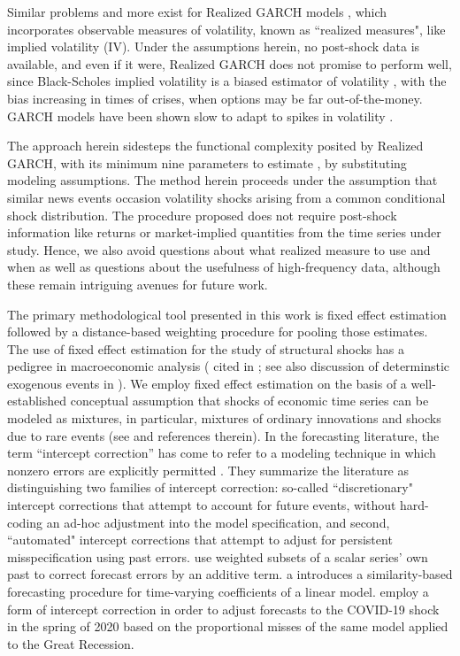 \documentclass[11pt,3p,review,authoryear]{elsarticle}
\theoremstyle{definition}
\begin{document}
Similar problems and more exist for Realized GARCH models \citep{hansen2012realized}, which incorporates observable measures of volatility, known as  ``realized measures", like implied volatility (IV).  Under the assumptions herein, no post-shock data is available, and even if it were, Realized GARCH does not promise to perform well, since Black-Scholes implied volatility is a biased estimator of volatility \citep{mayhew1995implied, christensen1998relation}, with the bias increasing in times of crises, when options may be far out-of-the-money.  GARCH models have been shown slow to adapt to spikes in volatility \citep{andersen2003modeling}.

The approach herein sidesteps the functional complexity posited by Realized GARCH, with its minimum nine parameters to estimate \citep{sharma2016forecasting}, by substituting modeling assumptions.  The method herein proceeds under the assumption that similar news events occasion volatility shocks arising from a common conditional shock distribution.  The procedure proposed does not require post-shock information like returns or market-implied quantities from the time series under study.  Hence, we also avoid questions about what realized measure to use and when as well as questions about the usefulness of high-frequency data, although these remain intriguing avenues for future work.

The primary methodological tool presented in this work is fixed effect estimation followed by a distance-based weighting procedure for pooling those estimates.  The use of fixed effect estimation for the study of structural shocks has a pedigree in macroeconomic analysis (\citet{romer1989does} cited in \citet{kilian2017structural}; see also discussion of determinstic exogenous events in \citet{engle2001good}).  We employ fixed effect estimation on the basis of a well-established conceptual assumption that shocks of economic time series can be modeled as mixtures, in particular, mixtures of ordinary innovations and shocks due to rare events (see \cite{phillips1996forecasting} and references therein).  In the forecasting literature, the term ``intercept correction'' has come to refer to a modeling technique in which nonzero errors are explicitly permitted \citep{hendry1994theory, clements1998forecasting}.  They summarize the literature as distinguishing two families of intercept correction: so-called ``discretionary" intercept corrections that attempt to account for future events, without hard-coding an ad-hoc adjustment into the model specification, and second, ``automated" intercept corrections that attempt to adjust for persistent misspecification using past errors.  \citet{guerron2017macroeconomic} use weighted subsets of a scalar series' own past to correct forecast errors by an additive term. \citet{dendramis2020similarity} a introduces a similarity-based forecasting procedure for time-varying coefficients of a linear model. \citet{foroni2022forecasting} employ a form of intercept correction in order to adjust forecasts to the COVID-19 shock in the spring of 2020 based on the proportional misses of the same model applied to the Great Recession.
\end{document}
